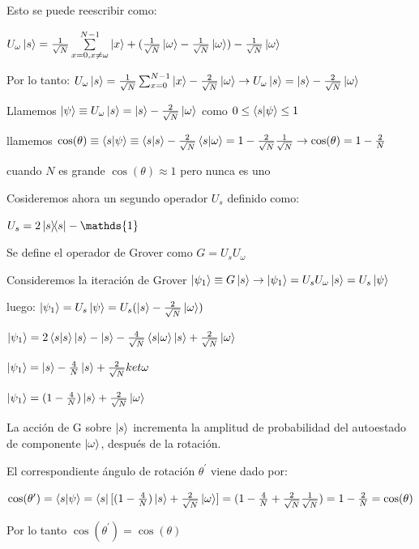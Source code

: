 \documentclass[11pt, spanish]{report}
\begin{document}
Esto se puede reescribir como:

$U_\omega \ket{s} = \frac{1}{\sqrt{N}} \sum\limits_{x=0, x\neq\omega}^{N-1}
\ket{x} + (\frac{1}{\sqrt{N}} \ket{\omega} - \frac{1}{\sqrt{N}} \ket{\omega} )- \frac{1}{\sqrt{N}} \ket{\omega} $

Por lo tanto: $U_\omega \ket{s} = \frac{1}{\sqrt{N}} \sum_{x=0}^{N-1} \ket{x} -
\frac{2}{\sqrt{N}} \ket{\omega} \rightarrow U_\omega \ket{s} = \ket{s} -
\frac{2}{\sqrt{N}} \ket{\omega}$

Llamemos $\ket{\psi} \equiv U_\omega \ket{s} = \ket{s} - \frac{2}{\sqrt{N}} \ket{\omega}$
como $0 \leq \braket{s}{\psi} \leq 1$

llamemos $\cos(\theta) \equiv \braket{s}{\psi} \equiv \braket{s}{s} -
\frac{2}{\sqrt{N}} \braket{s}{\omega} = 1 - \frac{2}{\sqrt{N}}
\frac{1}{\sqrt{N}} \rightarrow \cos(\theta) = 1 - \frac{2}{N}$

cuando $N$ es grande $\cos(\theta) \approx 1$ pero nunca es uno

Cosideremos ahora un segundo operador $U_s$ definido como:

$U_s = 2 \ketbra{s}{s} - \mathds{1}$

Se define el operador de Grover como $G = U_s U_\omega$

Consideremos la iteración de Grover $\ket{\psi_1} \equiv G \ket{s} \rightarrow
\ket{\psi_1} = U_s U_\omega \ket{s} = U_s \ket{\psi}$

luego: $\ket{\psi_1} = U_s \ket{\psi} = U_s (\ket{s} - \frac{2}{\sqrt{N}} \ket{\omega})$

$\ket{\psi_1} = 2 \braket{s}{s} \ket{s} - \ket{s} - \frac{4}{\sqrt{N}}
\braket{s}{\omega} \ket{s} + \frac{2}{\sqrt{N}} \ket{\omega} $

$\ket{\psi_1} = \ket{s} - \frac{4}{N} \ket{s} + \frac{2}{\sqrt{N}} ket{\omega} $

$\ket{\psi_1} = (1-\frac{4}{N}) \ket{s} + \frac{2}{\sqrt{N}} \ket{\omega} $

La acción de G sobre $\ket{s}$ incrementa la amplitud de probabilidad del
autoestado de componente $\ket{\omega}$, después de la rotación.

El correspondiente ángulo de rotación $\theta^\prime$ viene dado por:

$\cos(\theta^\prime) = \braket{s}{\psi} = \bra{s} [(1-\frac{4}{N})\ket{s} +
\frac{2}{\sqrt{N}} \ket{\omega}] =
(1-\frac{4}{N}+\frac{2}{\sqrt{N}}\frac{1}{\sqrt{N}}) = 1 - \frac{2}{N} = \cos(\theta)$

Por lo tanto $\cos(\theta^\prime) = \cos(\theta)$
\end{document}
